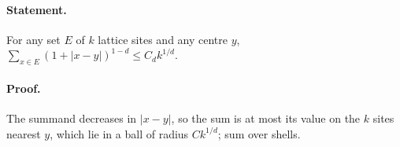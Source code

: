 \paragraph{Statement.} For any set $E$ of $k$ lattice sites and any centre $y$, $\sum_{x\in E}(1+|x-y|)^{1-d}\leq C_dk^{1/d}$.
\paragraph{Proof.} The summand decreases in $|x-y|$, so the sum is at most its value on the $k$ sites nearest $y$, which lie in a ball of radius $Ck^{1/d}$; sum over shells.

